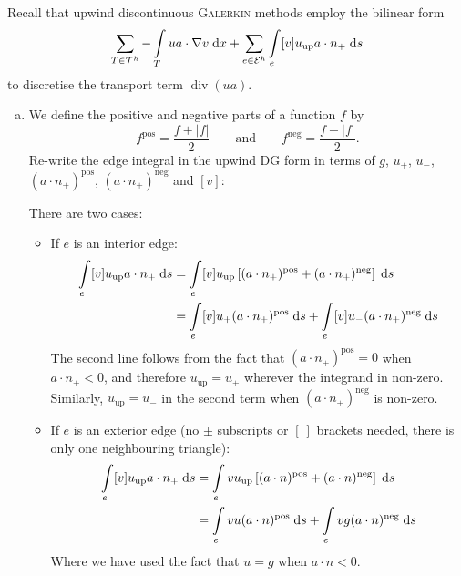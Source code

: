Recall that upwind discontinuous \textsc{Galerkin} methods employ the bilinear form
\begin{equation*}
\sum_{T\in\mathcal{T}^h} -\int\limits_T ua \cdot \nabla v \;\mathrm{d}x + \sum_{e\in\mathcal{E}^h} \int\limits_e [v] u_{\text{up}} a \cdot n_+ \;\mathrm{d}s
\end{equation*}
to discretise the transport term $\operatorname{div} (ua)$.
\begin{enumerate}[(a)]
\item We define the positive and negative parts of a function $f$ by
\begin{equation*}
f^{\text{pos}} = \frac{f + \lvert f \rvert}{2} \qquad \text{and} \qquad f^{\text{neg}} = \frac{f - \lvert f \rvert}{2}.
\end{equation*}
Re-write the edge integral in the upwind DG form in terms of $g$, $u_+$, $u_-$, $(a\cdot n_+)^{\text{pos}}$, $(a\cdot n_+)^{\text{neg}}$ and $[v]$:
\begin{solution}
There are two cases:
\begin{itemize}
\item If $e$ is an interior edge:
\begin{align*}
\int\limits_e [v] u_{\text{up}} a \cdot n_+ \;\mathrm{d}s
&= \int\limits_e [v] u_{\text{up}} \left[ (a\cdot n_+)^{\text{pos}} + (a\cdot n_+)^{\text{neg}} \right] \;\mathrm{d}s \\
&= \int\limits_e [v] u_+ (a\cdot n_+)^{\text{pos}} \;\mathrm{d}s + \int\limits_e [v] u_- (a\cdot n_+)^{\text{neg}} \;\mathrm{d}s
\end{align*}
The second line follows from the fact that $(a\cdot n_+)^{\text{pos}} = 0$ when $a\cdot n_+ < 0$, and therefore $u_{\text{up}} = u_+$ wherever the integrand in non-zero. Similarly, $u_{\text{up}} = u_-$ in the second term when $(a\cdot n_+)^{\text{neg}}$ is non-zero.
\vfill
\item If $e$ is an exterior edge (no $\pm$ subscripts or $[\:]$ brackets needed, there is only one neighbouring triangle):
\begin{align*}
\int\limits_e [v] u_{\text{up}} a \cdot n_+ \;\mathrm{d}s
&= \int\limits_e v u_{\text{up}} \left[ (a\cdot n)^{\text{pos}} + (a\cdot n)^{\text{neg}} \right] \;\mathrm{d}s \\
&= \int\limits_e v u (a\cdot n)^{\text{pos}} \;\mathrm{d}s + \int\limits_e v g (a\cdot n)^{\text{neg}} \;\mathrm{d}s
\end{align*}
Where we have used the fact that $u=g$ when $a\cdot n < 0$.
\end{itemize}
\end{solution}


\end{enumerate}
